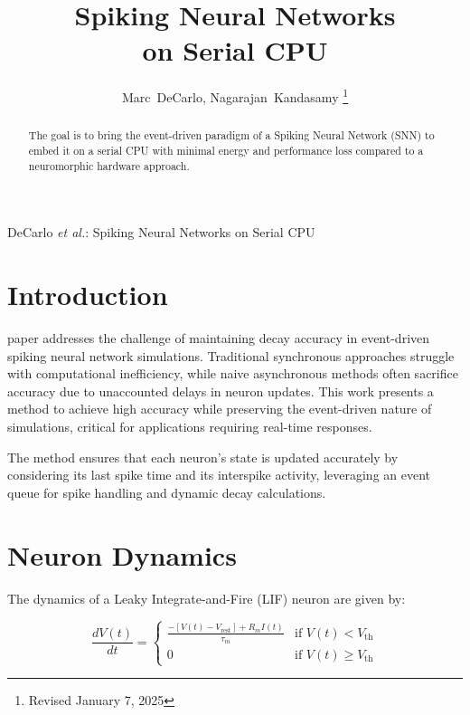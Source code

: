 \documentclass[journal]{IEEEtran}
\begin{document}
%
\title{Spiking Neural Networks\\ on Serial CPU}
\author{Marc~DeCarlo,
        Nagarajan~Kandasamy%
\thanks{Revised January 7, 2025}}


\markboth{}%
{DeCarlo \MakeLowercase{\textit{et al.}}: Spiking Neural Networks on Serial CPU}


\maketitle 

\begin{abstract}
The goal is to bring the event-driven paradigm of a Spiking Neural Network (SNN) to embed it on a serial CPU with minimal energy and performance loss compared to a neuromorphic hardware approach.
\end{abstract}
\IEEEpeerreviewmaketitle

\section{Introduction}
 paper addresses the challenge of maintaining decay accuracy in event-driven spiking neural network simulations. Traditional synchronous approaches struggle with computational inefficiency, while naive asynchronous methods often sacrifice accuracy due to unaccounted delays in neuron updates. This work presents a method to achieve high accuracy while preserving the event-driven nature of simulations, critical for applications requiring real-time responses.

The method ensures that each neuron's state is updated accurately by considering its last spike time and its interspike activity, leveraging an event queue for spike handling and dynamic decay calculations.

\section{Neuron Dynamics}
The dynamics of a Leaky Integrate-and-Fire (LIF) neuron are given by:

\begin{equation}
\frac{dV(t)}{dt} =
\begin{cases} 
\frac{-\left[V(t) - V_{\text{rest}}\right] + R_m I(t)}{\tau_m} & \text{if } V(t) < V_{\text{th}} \\
0 & \text{if } V(t) \geq V_{\text{th}}
\end{cases}
\label{eq:LIF_dynamics}
\end{equation}
\end{document}

